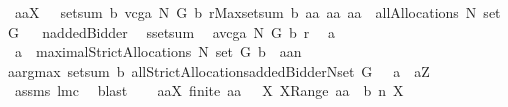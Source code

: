 \begin{isabellebody}
{\isacharparenleft}\ {\isachardoublequoteopen}{\isasymforall}aa{\isasymin}{\isacharquery}X{\isachardot}\ {\isacharunderscore}{\isachardoublequoteclose}{\isacharparenright}\ \ {\isachardoublequoteopen}setsum\ b\ {\isacharparenleft}vcga{\isacharprime}\ N\ G\ b\ r{\isacharparenright}{\isacharequal}Max{\isacharbraceleft}setsum\ b\ aa{\isacharbar}\ aa{\isachardot}\ aa\ {\isasymin}\ allAllocations{\isacharprime}\ N\ {\isacharparenleft}set\ G{\isacharparenright}{\isacharbraceright}{\isachardoublequoteclose}\isanewline
%
\isadelimproof
%
\endisadelimproof
%
\isatagproof
{}\isamarkupfalse%
\ {\isacharminus}\isanewline
{}\isamarkupfalse%
\ {\isacharquery}n{\isacharequal}addedBidder{\isacharprime}\ \isamarkupfalse%
\ {\isacharquery}s{\isacharequal}setsum\ \isamarkupfalse%
\ {\isacharquery}a{\isacharequal}{\isachardoublequoteopen}vcga{\isacharprime}\ N\ G\ b\ r{\isachardoublequoteclose}\ \isamarkupfalse%
\ a\ \ \isanewline
{}{\isacharcolon}\ {\isachardoublequoteopen}a\ {\isasymin}\ maximalStrictAllocations{\isacharprime}\ N\ {\isacharparenleft}set\ G{\isacharparenright}\ b\ {\isacharampersand}\ {\isacharquery}a{\isacharequal}a{\isacharminus}{\isacharminus}{\isacharquery}n\ {\isacharampersand}\ \isanewline
{\isacharparenleft}a{\isasymin}argmax\ {\isacharparenleft}setsum\ b{\isacharparenright}\ {\isacharparenleft}allStrictAllocations{\isacharprime}{\isacharparenleft}{\isacharbraceleft}addedBidder{\isacharprime}{\isacharbraceright}{\isasymunion}N{\isacharparenright}{\isacharparenleft}set\ G{\isacharparenright}{\isacharparenright}{\isacharparenright}{\isachardoublequoteclose}{\isacharparenleft}\ {\isachardoublequoteopen}{\isacharunderscore}\ {\isacharampersand}\ {\isacharquery}a{\isacharequal}{\isacharunderscore}\ {\isacharampersand}\ a{\isasymin}{\isacharquery}Z{\isachardoublequoteclose}{\isacharparenright}\isanewline
{}\isamarkupfalse%
\ assms{\isacharparenleft}{}{\isacharcomma}{}{\isacharcomma}{}{\isacharparenright}\ lm{}{}c\ \isamarkupfalse%
\ blast\ \isamarkupfalse%
\ \isanewline
{}{\isacharcolon}\ {\isachardoublequoteopen}{\isasymforall}aa{\isasymin}{\isacharquery}X{\isachardot}\ finite\ aa\ {\isacharampersand}\ {\isacharparenleft}{\isasymforall}\ X{\isachardot}\ X{\isasymin}Range\ aa\ {\isasymlongrightarrow}\ b\ {\isacharparenleft}{\isacharquery}n{\isacharcomma}\ X{\isacharparenright}{\isacharequal}{}{\isacharparenright}{\isachardoublequoteclose}\ \isamarkupfalse%

\end{isabellebody}
